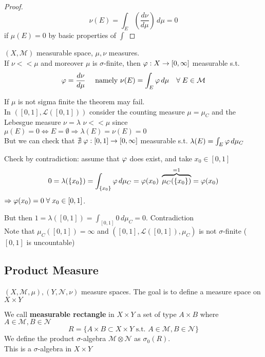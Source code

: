 \begin{proof}
    \[
        \nu(E) = \int_E \left(\frac{d\nu}{d\mu}\right) \, d\mu = 0
    \] 
    if \(\mu(E)=0\) by basic properties of \(\int\)
\end{proof}

\begin{theorem}
    \(\left(X, \mathcal{M}\right) \) measurable space, \(\mu, \nu\) measures. \\
    If \(\nu << \mu \) and moreover \(\mu \) is \(\sigma\)-finite, then \(\oldphi : X \to \left[0, \infty\right]\) measurable s.t.
    \[
        \oldphi = \frac{d \nu}{d \mu} \quad  \text{ namely } \nu(E)= \int_E \oldphi \, d\mu \quad \forall \; E \in \mathcal{M}
    \]
\end{theorem}

\begin{remark}
    If \(\mu\) is not sigma finite the theorem may fail. \\
    In \(\left(\left[0, 1\right], \mathcal{L}\left(\left[0, 1\right]\right)\right)\) consider the counting measure \(\mu = \mu_C\) and the Lebesgue measure \(\nu= \lambda\)
    \(\nu << \mu\) since \(\mu(E)= 0 \Leftrightarrow E= \emptyset \Rightarrow \lambda(E) = \nu(E)=0\) \\
    But we can check that \( \nexists \; \oldphi : \left[0, 1\right] \rightarrow \left[0, \infty \right]\) measurable s.t. \(\lambda(E)= \int_E \oldphi \, d\mu_C\)
\end{remark}

Check by contradiction: assume that \(\oldphi \) does exist, and take \(x_0 \in \left[0, 1\right]\)
\[ 
    0 = \lambda (\left\{x_0\right\}) = \int_{\left\{x_0\right\}} \oldphi \, d\mu_C = \oldphi (x_0) \; \overbrace{\mu_C (\left\{x_0\right\})}^{=1}= \oldphi (x_0)
\]
\(\Rightarrow \oldphi (x_0) = 0 \; \forall \; x_0 \in \left[0, 1\right]\).

But then \(1 = \lambda(\left[0, 1\right]) = \int_{\left[0, 1\right]} 0 \, d\mu_C = 0\). Contradiction \\
Note that \(\mu_C (\left[0, 1\right]) = \infty \) and \(\left( \left[0,1\right], \mathcal{L}(\left[0, 1\right]), \mu_C\right)\) is not \(\sigma\)-finite (\(\left[0,1\right]\) is uncountable)


\subsection*{Product Measure}
\( (X, \mathcal{M}, \mu), (Y, \mathcal{N}, \nu) \) measure spaces.
The goal is to define a measure space on \(X \times Y\)
\begin{definition}
    We call \textbf{measurable rectangle} in \(X \times Y\) a set of type \(A \times B\) where \(A \in \mathcal{M}, B \in \mathcal{N}\)
    \[  R = \{ A \times B \subset X\times Y \text{ s.t. } A \in \mathcal{M}, B \in \mathcal{N}\}\]
    We define the product \(\sigma\)-algebra \(\mathcal{M} \otimes \mathcal{N}\) as \(\sigma_0(R)\). \\
    This is a \(\sigma\)-algebra in \(X \times Y\)
\end{definition}

